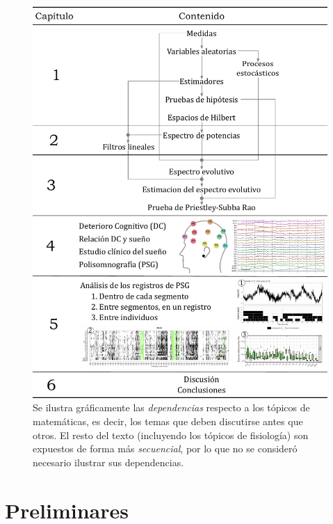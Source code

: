 \documentclass[12pt,letterpaper]{book}
\begin{document}
\begin{figure}
\centering
\includegraphics[width=.9\textwidth]{./estructura_texto_v2.pdf}
\caption[Estructura de la tesis]{Se ilustra gráficamente las \textit{dependencias} respecto a los tópicos de matemáticas, es decir, los temas que deben discutirse antes que otros. El resto del texto (incluyendo los tópicos de fisiología) son expuestos de forma más \textit{secuencial}, por lo que no se consideró necesario ilustrar sus dependencias.}
\label{intro:estructura}
\end{figure}


\chapter{Preliminares}
\end{document}
